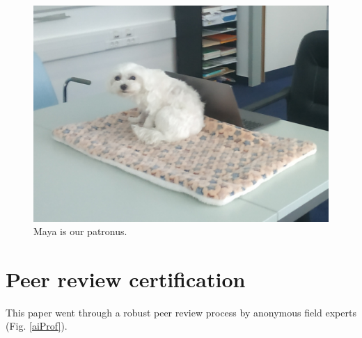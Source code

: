\documentclass[conference]{IEEEtran}
\begin{document}
\begin{figure}[htbp]
    \begin{center}
    \includegraphics[scale=0.16]{IMG_20221019_165459.jpg}
    \end{center}
    \caption{Maya is our patronus.}
\end{figure}


\section*{Peer review certification}
This paper went through a robust peer review process by anonymous field experts (Fig. \ref{aiProf}).
\end{document}
